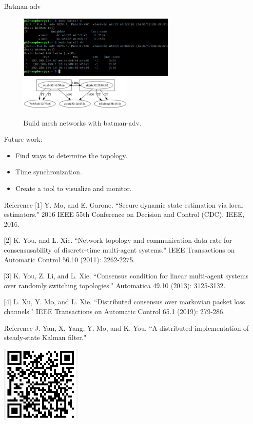 \documentclass[10pt]{beamer}
\DeclareMathOperator{\1}{\textbf{1}}
\begin{document}
\begin{frame}{Batman-adv}
	\begin{figure}
		\centering
		\includegraphics[width=0.7\textwidth]{pic/batman-adv.png}
		\includegraphics[width=0.5\textwidth]{pic/batman-topology.png}
		\caption{Build mesh networks with batman-adv.}
	\end{figure}
	Future work:
	\begin{itemize}
		\item Find ways to determine the topology.
		\item Time synchronization.
		\item Create a tool to visualize and monitor.
	\end{itemize}
\end{frame}

\begin{frame}{Reference}
\footnotesize [1] Y. Mo, and E. Garone. ``Secure dynamic state estimation via local estimators." 2016 IEEE 55th Conference on Decision and Control (CDC). IEEE, 2016.

[2] K. You, and L. Xie. ``Network topology and communication data rate for consensusability of discrete-time multi-agent systems." IEEE Transactions on Automatic Control 56.10 (2011): 2262-2275.

[3] K. You, Z. Li, and L. Xie. ``Consensus condition for linear multi-agent systems over randomly switching topologies." Automatica 49.10 (2013): 3125-3132.

[4] L. Xu, Y. Mo, and L. Xie. ``Distributed consensus over markovian packet loss channels." IEEE Transactions on Automatic Control 65.1 (2019): 279-286.
\end{frame}

\begin{frame}{Reference}
J. Yan, X. Yang, Y. Mo, and K. You. ``A distributed implementation of steady-state Kalman filter." 

\vspace{10pt}
\centering
\includegraphics[width=0.3\textwidth]{pic/qr.jpeg}
\end{frame}
\end{document}
